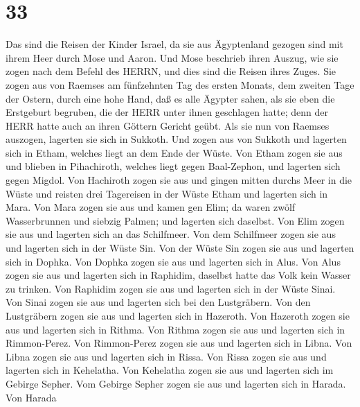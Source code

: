 \hypertarget{section-32}{%
\section{33}\label{section-32}}

 Das sind die Reisen der Kinder Israel, da sie aus
Ägyptenland gezogen sind mit ihrem Heer durch Mose und Aaron.
 Und Mose beschrieb ihren Auszug, wie sie zogen nach dem
Befehl des HERRN, und dies sind die Reisen ihres Zuges.  Sie
zogen aus von Raemses am fünfzehnten Tag des ersten Monats, dem zweiten
Tage der Ostern, durch eine hohe Hand, daß es alle Ägypter sahen,
 als sie eben die Erstgeburt begruben, die der HERR unter
ihnen geschlagen hatte; denn der HERR hatte auch an ihren Göttern
Gericht geübt.  Als sie nun von Raemses auszogen, lagerten
sie sich in Sukkoth.  Und zogen aus von Sukkoth und lagerten
sich in Etham, welches liegt an dem Ende der Wüste.  Von
Etham zogen sie aus und blieben in Pihachiroth, welches liegt gegen
Baal-Zephon, und lagerten sich gegen Migdol.  Von Hachiroth
zogen sie aus und gingen mitten durchs Meer in die Wüste und reisten
drei Tagereisen in der Wüste Etham und lagerten sich in Mara.
 Von Mara zogen sie aus und kamen gen Elim; da waren zwölf
Wasserbrunnen und siebzig Palmen; und lagerten sich daselbst.
 Von Elim zogen sie aus und lagerten sich an das
Schilfmeer.  Von dem Schilfmeer zogen sie aus und lagerten
sich in der Wüste Sin.  Von der Wüste Sin zogen sie aus und
lagerten sich in Dophka.  Von Dophka zogen sie aus und
lagerten sich in Alus.  Von Alus zogen sie aus und lagerten
sich in Raphidim, daselbst hatte das Volk kein Wasser zu trinken.
 Von Raphidim zogen sie aus und lagerten sich in der Wüste
Sinai.  Von Sinai zogen sie aus und lagerten sich bei den
Lustgräbern.  Von den Lustgräbern zogen sie aus und
lagerten sich in Hazeroth.  Von Hazeroth zogen sie aus und
lagerten sich in Rithma.  Von Rithma zogen sie aus und
lagerten sich in Rimmon-Perez.  Von Rimmon-Perez zogen sie
aus und lagerten sich in Libna.  Von Libna zogen sie aus
und lagerten sich in Rissa.  Von Rissa zogen sie aus und
lagerten sich in Kehelatha.  Von Kehelatha zogen sie aus
und lagerten sich im Gebirge Sepher.  Vom Gebirge Sepher
zogen sie aus und lagerten sich in Harada.  Von Harada
